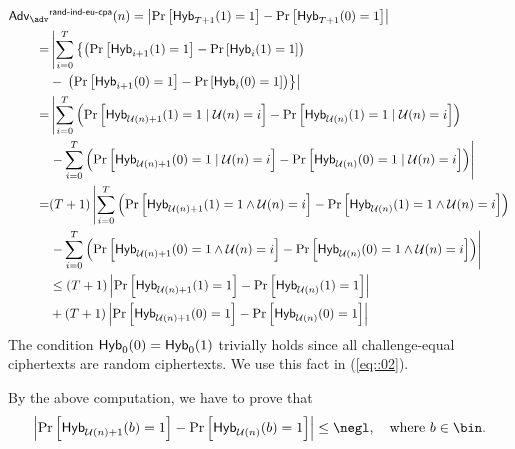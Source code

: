 \documentclass{fundam}
\begin{document}
\begin{align}
	\Adv_{\adv}&^{\EUS}(n) = \left| \Pr\left[ \tx{Hyb}_{T+1}(1)=1 \right]   -  \Pr\left[ \tx{Hyb}_{T+1}(0)=1 \right]   \right| \nonumber\\
	=&\left|  \sum_{i=0}^{T} \left\{   \left(  \Pr\left[   \tx{Hyb}_{i+1}(1)=1 \right]   -   \Pr\left[   \tx{Hyb}_{i}(1)=1 \right] \right) \right. \right. \nonumber\\
	& -   \left.\left. \left(  \Pr\left[   \tx{Hyb}_{i+1}(0)=1 \right]   -   \Pr\left[   \tx{Hyb}_{i}(0)=1 \right] \right)   \right\} \right|    \label{eq::02}\\
	=&\left|  \sum_{i=0}^{T}  \left(  \Pr\left[   \tx{Hyb}_{\mathcal{U}(n)+1}(1)=1 \mid \mathcal{U}(n) = i \right]   -   \Pr\left[   \tx{Hyb}_{\mathcal{U}(n)}(1)=1 \mid \mathcal{U}(n) = i \right] \right) \right. \nonumber \\
	&\left. - \sum_{i=0}^{T}  \left(  \Pr\left[   \tx{Hyb}_{\mathcal{U}(n)+1}(0)=1 \mid \mathcal{U}(n) = i \right]   -   \Pr\left[   \tx{Hyb}_{\mathcal{U}(n)}(0)=1 \mid \mathcal{U}(n) = i \right] \right) \right| \nonumber \\
	= & (T+1)\left|  \sum_{i=0}^{T}  \left(  \Pr\left[   \tx{Hyb}_{\mathcal{U}(n)+1}(1)=1 \land \mathcal{U}(n) = i \right]   -   \Pr\left[   \tx{Hyb}_{\mathcal{U}(n)}(1)=1 \land \mathcal{U}(n) = i \right] \right) \right. \nonumber\\ %
	&\left. - \sum_{i=0}^{T}  \left(  \Pr\left[   \tx{Hyb}_{\mathcal{U}(n)+1}(0)=1 \land \mathcal{U}(n) = i \right]   -   \Pr\left[   \tx{Hyb}_{\mathcal{U}(n)}(0)=1 \land \mathcal{U}(n) = i \right] \right) \right| \nonumber \\
	&\leq (T+1) \left|  \Pr\left[   \tx{Hyb}_{\mathcal{U}(n)+1}(1)=1\right] - \Pr\left[   \tx{Hyb}_{\mathcal{U}(n)}(1)=1  \right]  \right|  \nonumber \\
	&+  (T+1) \left|  \Pr\left[   \tx{Hyb}_{\mathcal{U}(n)+1}(0)=1\right] - \Pr\left[   \tx{Hyb}_{\mathcal{U}(n)}(0)=1  \right]  \right| \nonumber
\end{align}	
The condition $\mathsf{Hyb}_{0}(0)  =  \mathsf{Hyb}_{0}(1)$ trivially holds since all challenge-equal ciphertexts are random ciphertexts. We use this fact in (\ref{eq::02}). 

By the above computation, we have to prove that 
\begin{align*}
	\left|  \Pr\left[   \tx{Hyb}_{\mathcal{U}(n)+1}(b)=1\right] - \Pr\left[   \tx{Hyb}_{\mathcal{U}(n)}(b)=1  \right]  \right| \leq \negl, ~~~\text{where}~b\in\bin.
\end{align*} 
\end{document}
